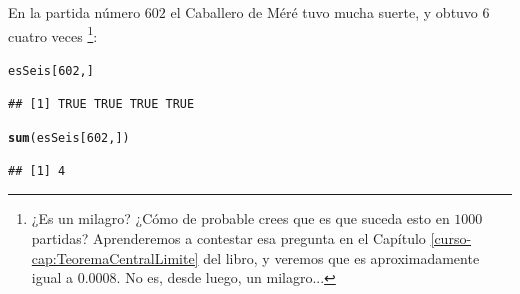 \documentclass[10pt,a4paper]{article}\usepackage[]{graphicx}\usepackage[]{color}
\makeatletter
\newcommand{\hlnum}[1]{\textcolor[rgb]{0.686,0.059,0.569}{#1}}%
\newcommand{\hlstd}[1]{\textcolor[rgb]{0.345,0.345,0.345}{#1}}%
\newcommand{\hlkwd}[1]{\textcolor[rgb]{0.737,0.353,0.396}{\textbf{#1}}}%
\newenvironment{kframe}{%
 \def\at@end@of@kframe{}%
 \ifinner\ifhmode%
  \def\at@end@of@kframe{\end{minipage}}%
  \begin{minipage}{\columnwidth}%
 \fi\fi%
 \def\FrameCommand##1{\hskip\@totalleftmargin \hskip-\fboxsep
 \colorbox{shadecolor}{##1}\hskip-\fboxsep
     \hskip-\linewidth \hskip-\@totalleftmargin \hskip\columnwidth}%
 \MakeFramed {\advance\hsize-\width
   \@totalleftmargin\z@ \linewidth\hsize
   \@setminipage}}%
 {\par\unskip\endMakeFramed%
 \at@end@of@kframe}
\newenvironment{knitrout}{}{} %
\newcounter {cont01}
\makeatother
\begin{document}
                                                                                                                                                                 En la partida número $602$ el Caballero de Méré tuvo mucha suerte, y obtuvo $6$ cuatro veces \footnote{¿Es un milagro? ¿Cómo de probable crees que es que suceda esto en $1000$ partidas? Aprenderemos a contestar esa pregunta en el Capítulo \ref{curso-cap:TeoremaCentralLimite} del libro, y veremos que es aproximadamente igual a $0.0008$. No es, desde luego, un milagro...}:
\begin{knitrout}
\color{fgcolor}\begin{kframe}
\begin{alltt}
\hlstd{esSeis[}\hlnum{602}\hlstd{, ]}
\end{alltt}
\begin{verbatim}
## [1] TRUE TRUE TRUE TRUE
\end{verbatim}
\begin{alltt}
                                                                                                                                                            \hlkwd{sum}\hlstd{(esSeis[}\hlnum{602}\hlstd{, ])}
\end{alltt}
\begin{verbatim}
## [1] 4
\end{verbatim}
\end{kframe}
\end{knitrout}
                                                                                                                                                                 
\end{document}
